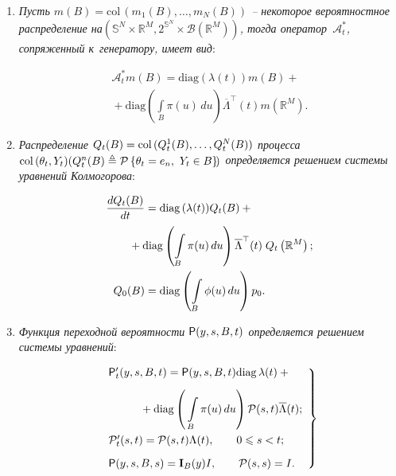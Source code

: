 \begin{multicols}{2}
\begin{enumerate}[1.]
\item \textit{Пусть $m(B) = \mathrm{col}\,(m_1(B),\ldots,m_N(B))$ -- некоторое вероятностное 
распределение на\linebreak $( \mathbb{S}^N \times  \mathbb{R}^M ,2^{\mathbb{S}^N}\times  
\mathcal{B}(\mathbb{R}^M))$, тогда оператор~$\mathcal{A}_t^*$, сопряженный к~генератору, имеет вид}:

\vspace*{-4pt}

\noindent
\begin{multline*}
\mathcal{A}_t^* m(B)  =
\mathrm{diag}\left(\lambda (t)\right) m(B) +{}\\
{}+
 \mathrm{diag}\left( \int\limits_B \pi(u)\,du \right) 
\overline{\Lambda}^{\top}(t) m(\mathbb{R}^M).
\end{multline*}

\item \textit{Распределение $Q_t(B) \hm= \mathrm{col}\, (Q_t^1(B),\ldots,Q_t^N(B))$ процесса 
$\mathrm{col}\,(\theta_t, Y_t) (Q_t^n(B) \ebd \mathcal{P}\left\{\theta_t \hm= e_n,\right.$\linebreak $\left. Y_t \hm\in B\right\}
\vphantom{\left(Q_t^n(B)\right)\ebd}\!\!
)$ 
определяется решением системы уравнений Колмогорова}:

\noindent
\begin{align*}
\fr{dQ_t(B)}{dt} &= \mathrm{diag}\,(\lambda (t)) Q_t(B) + {}\\
&\hspace*{-5mm}{}+\mathrm{diag}\left( \int\limits_B \pi(u)\,du 
\right) \overline{\Lambda}^{\top}(t) \; Q_t\left(\mathbb{R}^M\right);\\
Q_0(B)& = \mathrm{diag}\left( \int\limits_B \phi(u)\,du \right) p_0.
\end{align*}

\item \textit{Функция переходной вероятности ${\sf P}(y,s,B,t)$ определяется решением системы 
уравнений}:

\pagebreak

\noindent
\begin{equation}
\left.
\begin{array}{l}
\mathsf{P}'_t(y,s,B,t) = \displaystyle \mathsf{P}(y,s,B,t) \mathrm{diag}\,\lambda(t) +{}\\[9pt]
\hspace*{10mm}{}+ \mathrm{diag}\left(\, 
\displaystyle\int\limits_B \pi(u)\,du \right) \ppp(s,t)\overline{\Lambda}(t); \\[16pt]
\ppp'_t(s,t) = \ppp(s,t)\Lambda (t),\qquad 0 \leqslant s < t; \\[9pt]
\mathsf{P}(y,s,B,s) = \mathbf{I}_B(y)I,\qquad \ppp(s,s) = I.
\end{array}
\right\}
\label{eq:sys_2}
\end{equation}
\end{enumerate}


\end{multicols}
